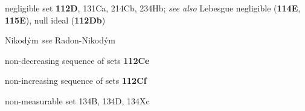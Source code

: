 \indexmedskip



































negligible set {\bf 112D}, 131Ca,
  214Cb, 234Hb; 
  {\it see also} 
Lebesgue negligible ({\bf 114E}, {\bf 115E}), null ideal ({\bf 112Db})




























Nikod\'ym {\it see} Radon-Nikod\'ym








non-decreasing sequence of sets {\bf 112Ce}

non-increasing sequence of sets {\bf 112Cf}

non-measurable set 134B, 134D, 134Xc















